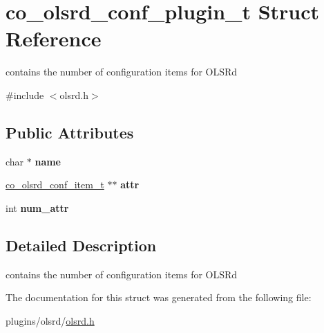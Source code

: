 \hypertarget{structco__olsrd__conf__plugin__t}{\section{co\+\_\+olsrd\+\_\+conf\+\_\+plugin\+\_\+t Struct Reference}
\label{structco__olsrd__conf__plugin__t}
}


contains the number of configuration items for O\+L\+S\+Rd  




{\ttfamily \#include $<$olsrd.\+h$>$}

\subsection*{Public Attributes}
\begin{DoxyCompactItemize}
\item 
\hypertarget{structco__olsrd__conf__plugin__t_a319fc3a99ae0a19e8f89fba89b06d8b4}{char $\ast$ {\bfseries name}}\label{structco__olsrd__conf__plugin__t_a319fc3a99ae0a19e8f89fba89b06d8b4}

\item 
\hypertarget{structco__olsrd__conf__plugin__t_a72daafcaa49bd4edea53ef7e8d45a113}{\hyperlink{structco__olsrd__conf__item__t}{co\+\_\+olsrd\+\_\+conf\+\_\+item\+\_\+t} $\ast$$\ast$ {\bfseries attr}}\label{structco__olsrd__conf__plugin__t_a72daafcaa49bd4edea53ef7e8d45a113}

\item 
\hypertarget{structco__olsrd__conf__plugin__t_a52fda09be70bafa8dcfc9a3c444bad30}{int {\bfseries num\+\_\+attr}}\label{structco__olsrd__conf__plugin__t_a52fda09be70bafa8dcfc9a3c444bad30}

\end{DoxyCompactItemize}


\subsection{Detailed Description}
contains the number of configuration items for O\+L\+S\+Rd 

The documentation for this struct was generated from the following file\+:\begin{DoxyCompactItemize}
\item 
plugins/olsrd/\hyperlink{olsrd_8h}{olsrd.\+h}\end{DoxyCompactItemize}
